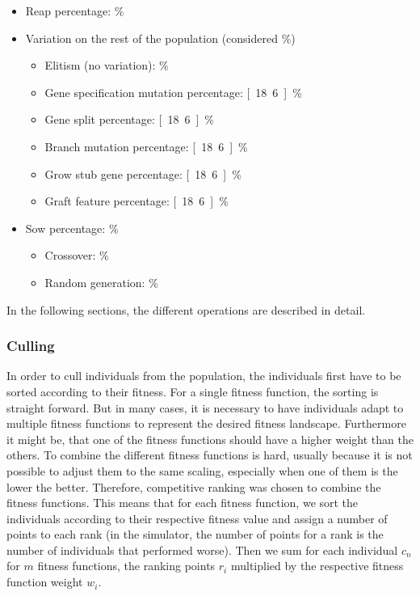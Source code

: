 \documentclass[main]{subfiles}
\begin{document}
\begin{itemize}
\item Reap percentage: \unit[15]{\%}
\item Variation on the rest of the population (considered \unit[100]{\%})
\begin{itemize}
\item Elitism (no variation): \unit[7]{\%}
\item Gene specification mutation percentage: \unit[18.6]{\%}
\item Gene split percentage: \unit[18.6]{\%}
\item Branch mutation percentage: \unit[18.6]{\%}
\item Grow stub gene percentage: \unit[18.6]{\%}
\item Graft feature percentage: \unit[18.6]{\%}
\end{itemize}
\item Sow percentage: \unit[15]{\%}
\begin{itemize}
\item Crossover: \unit[50]{\%}
\item Random generation: \unit[50]{\%}
\end{itemize}
\end{itemize}

In the following sections, the different operations are described in detail.

\subsubsection{Culling}
\label{subsubsection:Culling}

In order to cull individuals from the population, the individuals first have to be sorted according to their fitness. For a single fitness function, the sorting is straight forward. But in many cases, it is necessary to have individuals adapt to multiple fitness functions to represent the desired fitness landscape. Furthermore it might be, that one of the fitness functions should have a higher weight than the others. To combine the different fitness functions is hard, usually because it is not possible to adjust them to the same scaling, especially when one of them is the lower the better. Therefore, competitive ranking was chosen to combine the fitness functions. This means that for each fitness function, we sort the individuals according to their respective fitness value and assign a number of points to each rank (in the simulator, the number of points for a rank is the number of individuals that performed worse). Then we sum for each individual $c_n$ for $m$ fitness functions, the ranking points $r_i$ multiplied by the respective fitness function weight $w_i$. 
\end{document}
